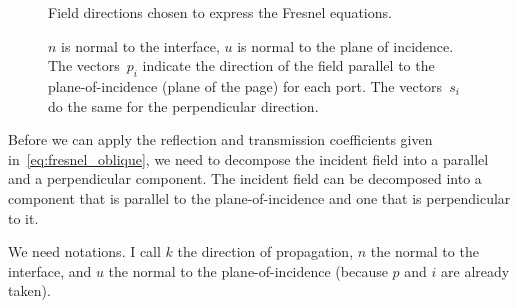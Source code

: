 \begin{figure}[hbtp]
    \centering
    
    \caption{\label{fig:fresnel_directions}Field directions chosen to express the Fresnel equations.}
    \caption*{
        $n$ is normal to the interface, $u$ is normal to the plane of incidence.
        The vectors~$p_i$ indicate the direction of the field parallel to the plane-of-incidence (plane of the page) for each port.  The vectors~$s_i$ do the same for the perpendicular direction.
    }
\end{figure}

Before we can apply the reflection and transmission coefficients given in~\cref{eq:fresnel_oblique}, we need to decompose the incident field into a parallel and a perpendicular component.
The incident field can be decomposed into a component that is parallel to the plane-of-incidence and one that is perpendicular to it.

We need notations.
I call $k$ the direction of propagation, $n$ the normal to the interface, and $u$ the normal to the plane-of-incidence (because $p$ and $i$ are already taken).

